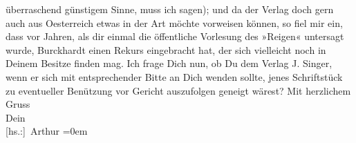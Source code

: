 \begin{ledgroupsized}[t]{13cm}
               überraschend günstigem Sinne, muss ich sagen); und da der Verlag doch gern auch aus
                  Oesterreich etwas in der Art möchte vorweisen
               können, so fiel mir ein, dass vor Jahren, als dir einmal die öffentliche Vorlesung
               des »Reigen« untersagt wurde, Burckhardt einen Rekurs eingebracht hat, der sich vielleicht
               noch in Deinem Besitze finden mag. Ich frage Dich nun, ob Du dem Verlag J. Singer, wenn er sich {\pb}mit entsprechender
               Bitte an Dich wenden sollte, jenes Schriftstück zu eventueller Benützung vor Gericht
               auszufolgen geneigt wärest? \pend
           \pstart
           Mit herzlichem Gruss{\\[\baselineskip]}Dein{\\[\baselineskip]}\spacefill\mbox{{[}hs.:{]} Arthur}\pend
           \leftskip=0em{}
         
         \endnumbering{}\end{ledgroupsized}  \newcommand{\dateiname}{L02181}\newcommand{\titel}{Arthur Schnitzler an Hermann Bahr, 12. 6. 1914}\newcommand{\editorInnen}{ Kurt Ifkovits,  Martin Anton Müller}
      